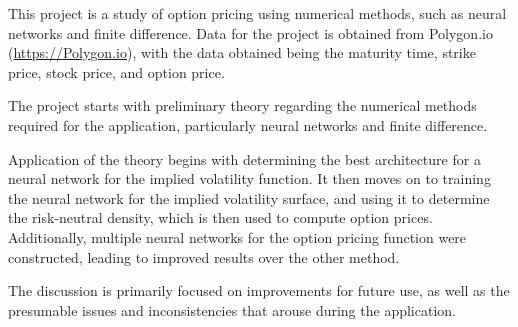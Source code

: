 This project is a study of option pricing using numerical methods, such as neural networks and finite difference. Data for the project is obtained from Polygon.io (\url{https://Polygon.io}), with the data obtained being the maturity time, strike price, stock price, and option price.

The project starts with preliminary theory regarding the numerical methods required for the application, particularly neural networks and finite difference.

Application of the theory begins with determining the best architecture for a neural network for the implied volatility function. It then moves on to training the neural network for the implied volatility surface, and using it to determine the risk-neutral density, which is then used to compute option prices. Additionally, multiple neural networks for the option pricing function were constructed, leading to improved results over the other method.

The discussion is primarily focused on improvements for future use, as well as the presumable issues and inconsistencies that arouse during the application.